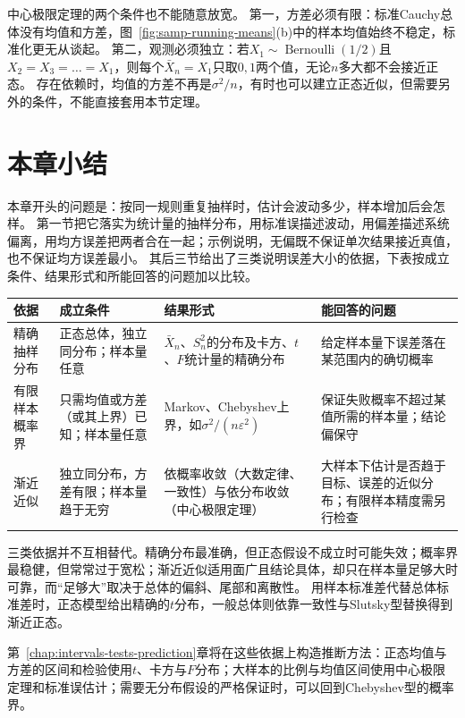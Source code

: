 中心极限定理的两个条件也不能随意放宽。
第一，方差必须有限：标准Cauchy总体没有均值和方差，图~\ref{fig:samp-running-means}(b)中的样本均值始终不稳定，标准化更无从谈起。
第二，观测必须独立：若$X_1\sim\operatorname{Bernoulli}(1/2)$且$X_2=X_3=\dots=X_1$，则每个$\bar X_n=X_1$只取$0,1$两个值，无论$n$多大都不会接近正态。
存在依赖时，均值的方差不再是$\sigma^2/n$，有时也可以建立正态近似，但需要另外的条件，不能直接套用本节定理。

\section{本章小结}
\label{sec:samp-summary}

本章开头的问题是：按同一规则重复抽样时，估计会波动多少，样本增加后会怎样。
第一节把它落实为统计量的抽样分布，用标准误描述波动，用偏差描述系统偏离，用均方误差把两者合在一起；示例说明，无偏既不保证单次结果接近真值，也不保证均方误差最小。
其后三节给出了三类说明误差大小的依据，下表按成立条件、结果形式和所能回答的问题加以比较。

\begin{center}
\small
\begin{tabularx}{\linewidth}{>{\raggedright\arraybackslash}p{4.6em}>{\raggedright\arraybackslash}X>{\raggedright\arraybackslash}X>{\raggedright\arraybackslash}X}
\toprule
依据 & 成立条件 & 结果形式 & 能回答的问题 \\
\midrule
精确抽样分布 & 正态总体，独立同分布；样本量任意 & $\bar X_n$、$S_n^2$的分布及卡方、$t$、$F$统计量的精确分布 & 给定样本量下误差落在某范围内的确切概率 \\
有限样本概率界 & 只需均值或方差（或其上界）已知；样本量任意 & Markov、Chebyshev上界，如$\sigma^2/(n\varepsilon^2)$ & 保证失败概率不超过某值所需的样本量；结论偏保守 \\
渐近近似 & 独立同分布，方差有限；样本量趋于无穷 & 依概率收敛（大数定律、一致性）与依分布收敛（中心极限定理） & 大样本下估计是否趋于目标、误差的近似分布；有限样本精度需另行检查 \\
\bottomrule
\end{tabularx}
\end{center}

三类依据并不互相替代。精确分布最准确，但正态假设不成立时可能失效；概率界最稳健，但常常过于宽松；渐近近似适用面广且结论具体，却只在样本量足够大时可靠，而“足够大”取决于总体的偏斜、尾部和离散性。
用样本标准差代替总体标准差时，正态模型给出精确的$t$分布，一般总体则依靠一致性与Slutsky型替换得到渐近正态。

第~\ref{chap:intervals-tests-prediction}章将在这些依据上构造推断方法：正态均值与方差的区间和检验使用$t$、卡方与$F$分布；大样本的比例与均值区间使用中心极限定理和标准误估计；需要无分布假设的严格保证时，可以回到Chebyshev型的概率界。
